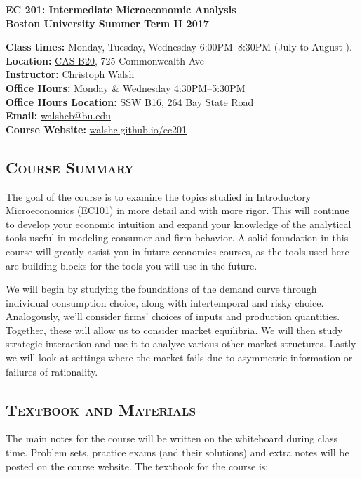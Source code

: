 \documentclass[10pt]{article}
\begin{document}
\noindent
\begin{center}
  \Large{\textbf{EC 201: Intermediate Microeconomic Analysis}} \\
  \medskip
  \large{\textbf{Boston University Summer Term II 2017}}
  \bigskip
\end{center}
\textbf{Class times:} Monday, Tuesday, Wednesday 6:00PM--8:30PM (July  to August ). \\
\textbf{Location:} \href{https://www.bu.edu/classrooms/classroom/cas-b20/}{CAS B20}, 725 Commonwealth Ave \\
\textbf{Instructor:} Christoph Walsh\\
\textbf{Office Hours:} Monday \& Wednesday 4:30PM--5:30PM \\
\textbf{Office Hours Location:}
\href{https://www.google.com/maps/place/Boston+University+School+of+Social+Work/@42.350845,-71.1052384,15z/data=!4m2!3m1!1s0x0:0xe9b0a401410ded28?sa=X&ved=0ahUKEwibjuTl_b7MAhXKJR4KHdfDAScQ_BIIdDAO}{SSW} B16, 264 Bay State Road \\
\textbf{Email:} \href{mailto:walshcb@bu.edu}{walshcb@bu.edu} \\
\textbf{Course Website:}
\href{https://walshc.github.io/ec201}{walshc.github.io/ec201}
\subsection*{\textsc{Course Summary}}
The goal of the course is to examine the topics studied in Introductory Microeconomics (EC101) in more detail and with more rigor. This will continue to develop your economic intuition and expand your knowledge of the analytical tools useful in modeling consumer and firm behavior. A solid foundation in this course will greatly assist you in future economics courses, as the tools used here are building blocks for the tools you will use in the future.

We will begin by studying the foundations of the demand curve through individual consumption choice, along with intertemporal and risky choice.  Analogously, we'll consider firms' choices of inputs and production quantities.  Together, these will allow us to consider market equilibria. We will then study strategic interaction and use it to analyze various other market structures.  Lastly we will look at settings where the market fails due to asymmetric information or failures of rationality.

\subsection*{\textsc{Textbook and Materials}}
The main notes for the course will be written on the whiteboard during class time. Problem sets, practice exams (and their solutions) and extra notes will be posted on the course website. The textbook for the course is:
\end{document}
